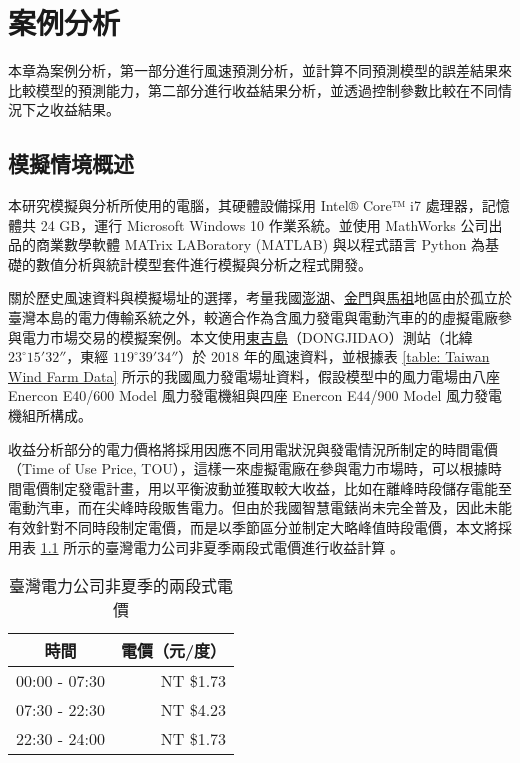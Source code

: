 
\chapter{案例分析}

本章為案例分析，第一部分進行風速預測分析，並計算不同預測模型的誤差結果來比較模型的預測能力，第二部分進行收益結果分析，並透過控制參數比較在不同情況下之收益結果。

\section{模擬情境概述}

本研究模擬與分析所使用的電腦，其硬體設備採用 Intel® Core™ i7 處理器，記憶體共 24 GB，運行 Microsoft Windows 10 作業系統。並使用 MathWorks 公司出品的商業數學軟體 MATrix LABoratory (MATLAB) 與以程式語言 Python 為基礎的數值分析與統計模型套件進行模擬與分析之程式開發。

關於歷史風速資料與模擬場址的選擇，考量我國\uline{澎湖}、\uline{金門}與\uline{馬祖}地區由於孤立於臺灣本島的電力傳輸系統之外，較適合作為含風力發電與電動汽車的的虛擬電廠參與電力市場交易的模擬案例。本文使用\uline{東吉島}（DONGJIDAO）測站（北緯 $23^\circ 15' 32''$，東經 $119^\circ 39'34''$）於 2018 年的風速資料，並根據表 \ref{table: Taiwan Wind Farm Data} 所示的我國風力發電場址資料，假設模型中的風力電場由八座 Enercon E40/600 Model 風力發電機組與四座 Enercon E44/900 Model 風力發電機組所構成。

收益分析部分的電力價格將採用因應不同用電狀況與發電情況所制定的時間電價（Time of Use Price, TOU），這樣一來虛擬電廠在參與電力市場時，可以根據時間電價制定發電計畫，用以平衡波動並獲取較大收益，比如在離峰時段儲存電能至電動汽車，而在尖峰時段販售電力。但由於我國智慧電錶尚未完全普及，因此未能有效針對不同時段制定電價，而是以季節區分並制定大略峰值時段電價，本文將採用表 \ref{table: Electric Price} 所示的臺灣電力公司非夏季兩段式電價進行收益計算 \cite{taipower2018price}。

\begin{table}[htp]
  \centering
  \caption[臺灣電力公司非夏季兩段式電價]{臺灣電力公司非夏季的兩段式電價 \cite{taipower2018price}}
  \begin{tabular}{cr}
    \toprule
    \textbf{時間}   & \textbf{電價（元/度）}   \\
    \midrule
    00:00 - 07:30   & NT \$1.73                \\
    07:30 - 22:30   & NT \$4.23                \\
    22:30 - 24:00   & NT \$1.73                \\
    \bottomrule
  \end{tabular}
  \label{table: Electric Price}
\end{table}


